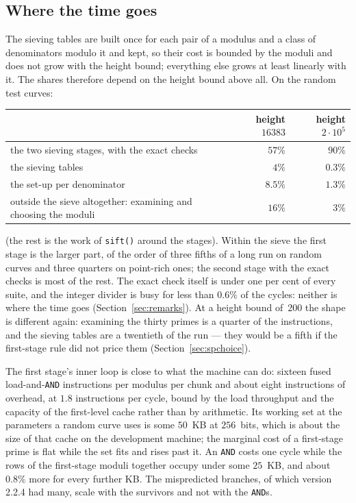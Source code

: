 \documentclass[12pt,a4paper,oneside]{amsart}
\begin{document}
\subsection{Where the time goes}\label{app:profile}

The sieving tables are built once for each pair of a modulus and a class
of denominators modulo it and kept, so their cost is bounded by the moduli
and does not grow with the height bound; everything else grows at least
linearly with it. The shares therefore depend on the height bound above
all. On the random test curves:
\begin{center}\small
\begin{tabular}{lrr}
 & height $16383$ & height $2\cdot10^5$ \\
\hline
the two sieving stages, with the exact checks & $57\%$ & $90\%$ \\
the sieving tables & $4\%$ & $0.3\%$ \\
the set-up per denominator & $8.5\%$ & $1.3\%$ \\
outside the sieve altogether: examining and choosing the moduli & $16\%$ & $3\%$ \\
\end{tabular}
\end{center}
(the rest is the work of \texttt{sift()} around the stages). Within the
sieve the first stage is the larger part, of the order of three fifths of a
long run on random curves and three quarters on point-rich ones; the second
stage with the exact checks is most of the rest. The exact check itself is
under one per cent of every suite, and the integer divider is busy for less
than $0.6\%$ of the cycles: neither is where the time goes
(Section~\ref{sec:remarks}). At a height bound of~$200$ the shape is
different again: examining the thirty primes is a quarter of the
instructions, and the sieving tables are a twentieth of the run --- they
would be a fifth if the first-stage rule did not price them
(Section~\ref{sec:spchoice}).

The first stage's inner loop is close to what the machine can do: sixteen
fused load-and-\texttt{AND} instructions per modulus per chunk and about
eight instructions of overhead, at $1.8$ instructions per cycle, bound by
the load throughput and the capacity of the first-level cache rather than
by arithmetic. Its working set at the parameters a random curve uses is
some $50$~KB at $256$~bits, which is about the size of that cache on the
development machine; the marginal cost of a first-stage prime is flat while
the set fits and rises past it. An \texttt{AND} costs one cycle while the
rows of the first-stage moduli together occupy under some $25$~KB, and about
$0.8\%$ more for every further KB. The mispredicted branches, of which
version 2.2.4 had many, scale with the survivors and not with the
\texttt{AND}s.
\end{document}
